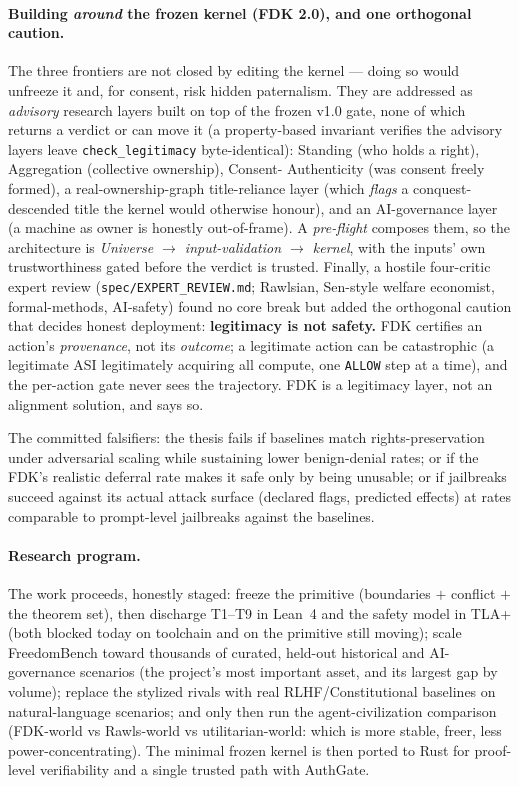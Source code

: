 \documentclass[11pt]{article}
\begin{document}
\paragraph{Building \emph{around} the frozen kernel (FDK 2.0), and one orthogonal caution.}
The three frontiers are not closed by editing the kernel --- doing so would unfreeze it and,
for consent, risk hidden paternalism. They are addressed as \emph{advisory} research layers
built on top of the frozen v1.0 gate, none of which returns a verdict or can move it (a
property-based invariant verifies the advisory layers leave \texttt{check\_legitimacy}
byte-identical): Standing (who holds a right), Aggregation (collective ownership), Consent-
Authenticity (was consent freely formed), a real-ownership-graph title-reliance layer (which
\emph{flags} a conquest-descended title the kernel would otherwise honour), and an AI-governance
layer (a machine as owner is honestly out-of-frame). A \emph{pre-flight} composes them, so the
architecture is \emph{Universe $\to$ input-validation $\to$ kernel}, with the inputs' own
trustworthiness gated before the verdict is trusted. Finally, a hostile four-critic expert
review (\texttt{spec/EXPERT\_REVIEW.md}; Rawlsian, Sen-style welfare economist, formal-methods,
AI-safety) found no core break but added the orthogonal caution that decides honest deployment:
\textbf{legitimacy is not safety.} FDK certifies an action's \emph{provenance}, not its
\emph{outcome}; a legitimate action can be catastrophic (a legitimate ASI legitimately acquiring
all compute, one \texttt{ALLOW} step at a time), and the per-action gate never sees the
trajectory. FDK is a legitimacy layer, not an alignment solution, and says so.

The committed falsifiers: the thesis fails if baselines match rights-preservation under
adversarial scaling while sustaining lower benign-denial rates; or if the FDK's realistic
deferral rate makes it safe only by being unusable; or if jailbreaks succeed against its actual
attack surface (declared flags, predicted effects) at rates comparable to prompt-level
jailbreaks against the baselines.

\paragraph{Research program.} The work proceeds, honestly staged: freeze the primitive
(boundaries $+$ conflict $+$ the theorem set), then discharge T1--T9 in Lean~4 and the safety
model in TLA+ (both blocked today on toolchain and on the primitive still moving); scale
FreedomBench toward thousands of curated, held-out historical and AI-governance scenarios
(the project's most important asset, and its largest gap by volume); replace the stylized
rivals with real RLHF/Constitutional baselines on natural-language scenarios; and only then run
the agent-civilization comparison (FDK-world vs Rawls-world vs utilitarian-world: which is more
stable, freer, less power-concentrating). The minimal frozen kernel is then ported to Rust for
proof-level verifiability and a single trusted path with AuthGate.
\end{document}
